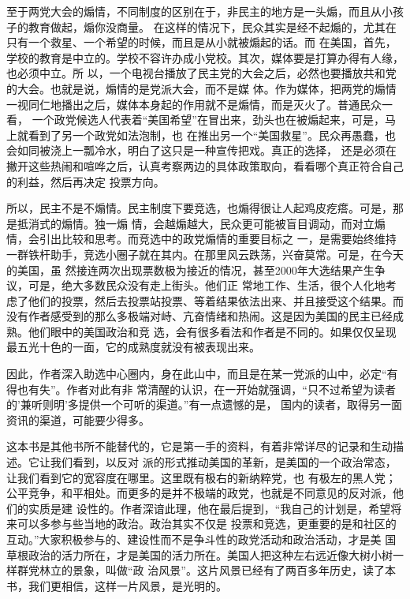 ﻿\documentclass[11pt]{article}
\begin{document}
至于两党大会的煽情，不同制度的区别在于，非民主的地方是一头煽，而且从小孩子的教育做起，煽你没商量。
在这样的情况下，民众其实是经不起煽的，尤其在只有一个救星、一个希望的时候，而且是从小就被煽起的话。而
在美国，首先，学校的教育是中立的。学校不容许办成小党校。其次，媒体要是打算办得有人缘，也必须中立。所
以，一个电视台播放了民主党的大会之后，必然也要播放共和党的大会。也就是说，煽情的是党派大会，而不是媒
体。作为媒体，把两党的煽情一视同仁地播出之后，媒体本身起的作用就不是煽情，而是灭火了。普通民众一看，
一个政党候选人代表着``美国希望''在冒出来，劲头也在被煽起来，可是，马上就看到了另一个政党如法泡制，也
在推出另一个``美国救星''。民众再愚蠢，也会如同被浇上一瓢冷水，明白了这只是一种宣传把戏。真正的选择，
还是必须在撇开这些热闹和喧哗之后，认真考察两边的具体政策取向，看看哪个真正符合自己的利益，然后再决定
投票方向。

所以，民主不是不煽情。民主制度下要竞选，也煽得很让人起鸡皮疙瘩。可是，那是抵消式的煽情。独一煽
情，会越煽越大，民众更可能被盲目调动，而对立煽情，会引出比较和思考。而竞选中的政党煽情的重要目标之
一，是需要始终维持一群铁杆助手，竞选小圈子就在其内。在那里风云跌荡，兴奋莫常。可是，在今天的美国，虽
然接连两次出现票数极为接近的情况，甚至2000年大选结果产生争议，可是，绝大多数民众没有走上街头。他们正
常地工作、生活，很个人化地考虑了他们的投票，然后去投票站投票、等着结果依法出来、并且接受这个结果。而
没有作者感受到的那么多极端对峙、亢奋情绪和热闹。这是因为美国的民主已经成熟。他们眼中的美国政治和竞
选，会有很多看法和作者是不同的。如果仅仅呈现最五光十色的一面，它的成熟度就没有被表现出来。

因此，作者深入助选中心圈内，身在此山中，而且是在某一党派的山中，必定``有得也有失''。作者对此有非
常清醒的认识，在一开始就强调，``只不过希望为读者的'兼听则明'多提供一个可听的渠道。''有一点遗憾的是，
国内的读者，取得另一面资讯的渠道，可能要少得多。

这本书是其他书所不能替代的，它是第一手的资料，有着非常详尽的记录和生动描述。它让我们看到，以反对
派的形式推动美国的革新，是美国的一个政治常态，让我们看到它的宽容度在哪里。这里既有极右的新纳粹党，也
有极左的黑人党；公平竞争，和平相处。而更多的是并不极端的政党，也就是不同意见的反对派，他们的实质是建
设性的。作者深谙此理，他在最后提到，``我自己的计划是，希望将来可以多参与些当地的政治。政治其实不仅是
投票和竞选，更重要的是和社区的互动。''大家积极参与的、建设性而不是争斗性的政党活动和政治活动，才是美
国草根政治的活力所在，才是美国的活力所在。美国人把这种左右远近像大树小树一样群党林立的景象，叫做``政
治风景''。这片风景已经有了两百多年历史，读了本书，我们更相信，这样一片风景，是光明的。
\end{document}
